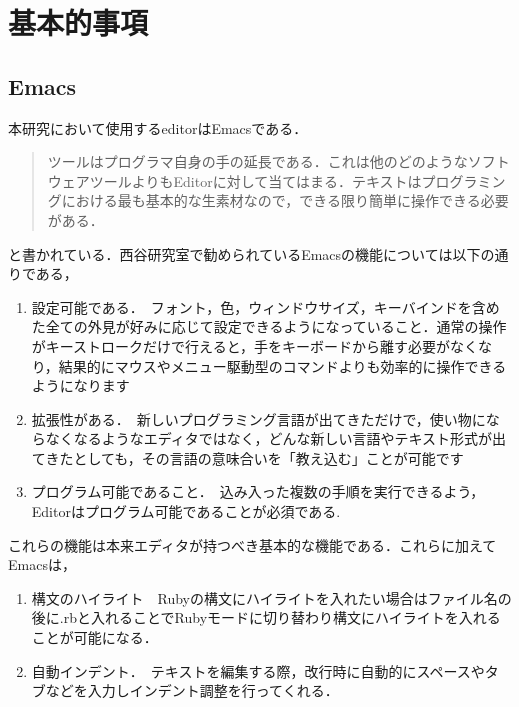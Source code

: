 \chapter{基本的事項}\label{ux57faux672cux7684ux4e8bux9805}

    \section{Emacs}\label{emacs}

    本研究において使用するeditorはEmacsである．
\begin{quotation}
ツールはプログラマ自身の手の延長である．これは他のどのようなソフトウェアツールよりもEditorに対して当てはまる．テキストはプログラミングにおける最も基本的な生素材なので，できる限り簡単に操作できる必要がある． \cite{達人プログラマー} 
\end{quotation}

と書かれている．西谷研究室で勧められているEmacsの機能については以下の通りである，

\begin{enumerate}
\def\labelenumi{\arabic{enumi}.}
\tightlist
\item
  設定可能である．　フォント，色，ウィンドウサイズ，キーバインドを含めた全ての外見が好みに応じて設定できるようになっていること．通常の操作がキーストロークだけで行えると，手をキーボードから離す必要がなくなり，結果的にマウスやメニュー駆動型のコマンドよりも効率的に操作できるようになります
\item
  拡張性がある．　新しいプログラミング言語が出てきただけで，使い物にならなくなるようなエディタではなく，どんな新しい言語やテキスト形式が出てきたとしても，その言語の意味合いを「教え込む」ことが可能です
\item
  プログラム可能であること．　込み入った複数の手順を実行できるよう，Editorはプログラム可能であることが必須である.
\end{enumerate}

これらの機能は本来エディタが持つべき基本的な機能である．これらに加えてEmacsは，

\begin{enumerate}
\def\labelenumi{\arabic{enumi}.}
\tightlist
\item
  構文のハイライト　Rubyの構文にハイライトを入れたい場合はファイル名の後に.rbと入れることでRubyモードに切り替わり構文にハイライトを入れることが可能になる．
\item
  自動インデント．　テキストを編集する際，改行時に自動的にスペースやタブなどを入力しインデント調整を行ってくれる．
\end{enumerate}

